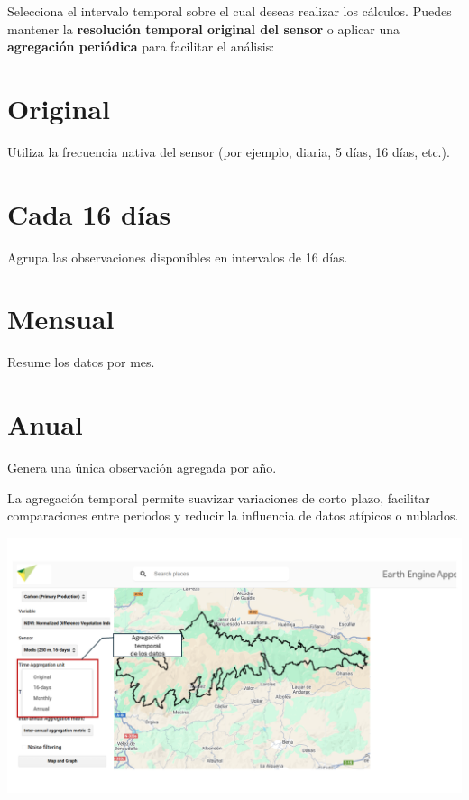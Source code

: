 \documentclass[
]{book}
\begin{document}
Selecciona el intervalo temporal sobre el cual deseas realizar los cálculos. Puedes mantener la \textbf{resolución temporal original del sensor} o aplicar una \textbf{agregación periódica} para facilitar el análisis:

\section{\texorpdfstring{\textbf{Original}}{Original}}\label{original}

Utiliza la frecuencia nativa del sensor (por ejemplo, diaria, 5 días, 16 días, etc.).

\section{\texorpdfstring{\textbf{Cada 16 días}}{Cada 16 días}}\label{cada-16-duxedas}

Agrupa las observaciones disponibles en intervalos de 16 días.

\section{\texorpdfstring{\textbf{Mensual}}{Mensual}}\label{mensual}

Resume los datos por mes.

\section{\texorpdfstring{\textbf{Anual}}{Anual}}\label{anual}

Genera una única observación agregada por año.

La agregación temporal permite suavizar variaciones de corto plazo, facilitar comparaciones entre periodos y reducir la influencia de datos atípicos o nublados.

\includegraphics{assets/aggregation_es.png}
\end{document}
